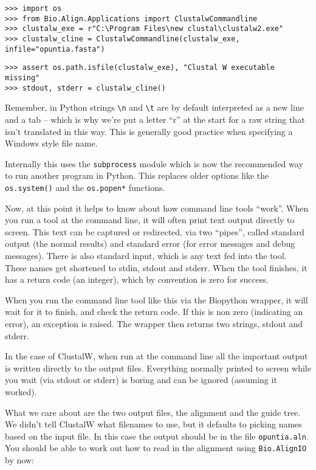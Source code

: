 \begin{verbatim}
>>> import os
>>> from Bio.Align.Applications import ClustalwCommandline
>>> clustalw_exe = r"C:\Program Files\new clustal\clustalw2.exe"
>>> clustalw_cline = ClustalwCommandline(clustalw_exe, infile="opuntia.fasta")
\end{verbatim}
\begin{verbatim}
>>> assert os.path.isfile(clustalw_exe), "Clustal W executable missing"
>>> stdout, stderr = clustalw_cline()
\end{verbatim}

\noindent Remember, in Python strings \verb|\n| and \verb|\t| are by default
interpreted as a new line and a tab -- which is why we're put a letter
``r'' at the start for a raw string that isn't translated in this way.
This is generally good practice when specifying a Windows style file name.

Internally this uses the
\verb|subprocess| module which is now the recommended way to run another
program in Python. This replaces older options like the \verb|os.system()|
and the \verb|os.popen*| functions.

Now, at this point it helps to know about how command line tools ``work''.
When you run a tool at the command line, it will often print text output
directly to screen. This text can be captured or redirected, via
two ``pipes'', called standard output (the normal results) and standard
error (for error messages and debug messages). There is also standard
input, which is any text fed into the tool. These names get shortened
to stdin, stdout and stderr. When the tool finishes, it has a return
code (an integer), which by convention is zero for success.

When you run the command line tool like this via the Biopython wrapper,
it will wait for it to finish, and check the return code. If this is
non zero (indicating an error), an exception is raised. The wrapper
then returns two strings, stdout and stderr.

In the case of ClustalW, when run at the command line all the important
output is written directly to the output files. Everything normally printed to
screen while you wait (via stdout or stderr) is boring and can be
ignored (assuming it worked).

What we care about are the two output files, the alignment and the guide
tree. We didn't tell ClustalW what filenames to use, but it defaults to
picking names based on the input file. In this case the output should be
in the file \verb|opuntia.aln|.
You should be able to work out how to read in the alignment using
\verb|Bio.AlignIO| by now:

